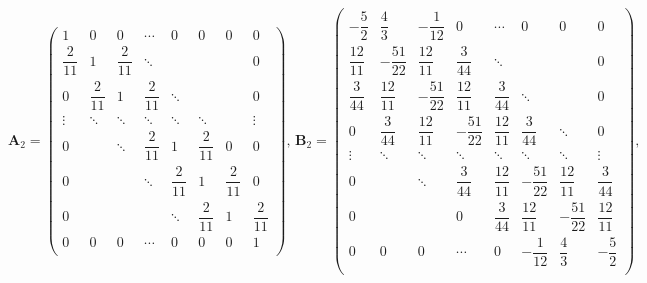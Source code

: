 \documentclass[11pt,a4paper]{amsart}
\theoremstyle{plain}
\theoremstyle{definition}
\theoremstyle{remark}
\numberwithin{equation}{section}
\begin{document}
\begin{equation} 
\mathbf{A}_2 = 
\begin{pmatrix}
1 & 0 & 0 & \cdots & 0 & 0 & 0 & 0 \\[0.3cm]
\dfrac{2}{11} & 1 & \dfrac{2}{11} & \ddots & & & & 0 \\[0.3cm]
0 & \dfrac{2}{11} & 1 & \dfrac{2}{11} & \ddots & & & 0 \\[0.3cm]
\vdots & \ddots & \ddots & \ddots & \ddots & \ddots & & \vdots \\[0.3cm]
0 & & \ddots & \dfrac{2}{11} & 1 & \dfrac{2}{11} & 0 & 0 \\[0.3cm]
0 & & & \ddots & \dfrac{2}{11} & 1 & \dfrac{2}{11} & 0 \\[0.3cm]
0 & & & & \ddots & \dfrac{2}{11} & 1 & \dfrac{2}{11} \\[0.3cm]
0 & 0 & 0 & \cdots & 0 & 0 & 0 & 1 \\
\end{pmatrix}
,\,
\mathbf{B}_2 = 
\begin{pmatrix}
-\dfrac{5}{2} & \dfrac{4}{3} & -\dfrac{1}{12} & 0 & \cdots & 0 & 0 & 0 \\[0.3cm]
\dfrac{12}{11} & -\dfrac{51}{22} & \dfrac{12}{11} & \dfrac{3}{44} & \ddots & & & 0 \\[0.3cm]
\dfrac{3}{44} & \dfrac{12}{11} & -\dfrac{51}{22} & \dfrac{12}{11} & \dfrac{3}{44} & \ddots & & 0 \\[0.3cm]
0 & \dfrac{3}{44} & \dfrac{12}{11} & -\dfrac{51}{22} & \dfrac{12}{11} & \dfrac{3}{44} & \ddots & 0 \\[0.3cm]
\vdots & \ddots & \ddots & \ddots & \ddots & \ddots & \ddots & \vdots \\[0.3cm]
0 & & \ddots & \dfrac{3}{44} & \dfrac{12}{11} & -\dfrac{51}{22} & \dfrac{12}{11} & \dfrac{3}{44} \\[0.3cm]
0 & & & 0 & \dfrac{3}{44} & \dfrac{12}{11} & -\dfrac{51}{22} & \dfrac{12}{11} \\[0.3cm]
0 & 0 & 0 & \cdots & 0 & -\dfrac{1}{12} & \dfrac{4}{3} & -\dfrac{5}{2} \\
\end{pmatrix},
\end{equation}
\end{document}
